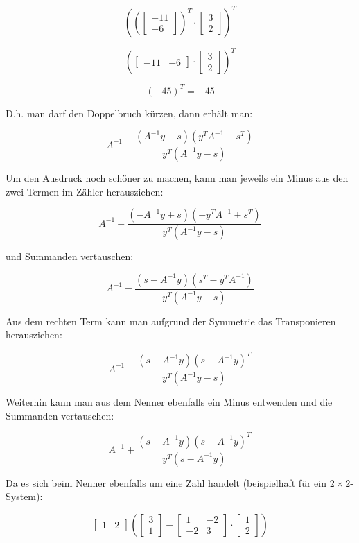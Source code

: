 \documentclass[a4paper, 12pt]{report}
\begin{document}
$$\left( \left(\begin{bmatrix}-11\\-6\end{bmatrix} \right)^T \cdot \begin{bmatrix}3\\2\end{bmatrix} \right)^T$$

$$\left( \begin{bmatrix}-11 & -6\end{bmatrix} \cdot \begin{bmatrix}3\\2\end{bmatrix} \right)^T$$

$$\left( -45 \right)^T = -45$$

D.h. man darf den Doppelbruch kürzen, dann erhält man:

$$ A^{-1} - \frac{ (A^{-1}y - s)(y^TA^{-1} - s^T) }{ y^T(A^{-1}y - s) } $$

Um den Ausdruck noch schöner zu machen, kann man jeweils ein Minus aus den zwei Termen im Zähler herausziehen:

$$ A^{-1} - \frac{ (-A^{-1}y + s)(-y^TA^{-1} + s^T) }{ y^T(A^{-1}y - s) } $$

und Summanden vertauschen:

$$ A^{-1} - \frac{ (s - A^{-1}y )(s^T - y^TA^{-1}) }{ y^T(A^{-1}y - s) } $$

Aus dem rechten Term kann man aufgrund der Symmetrie das Transponieren herausziehen:

$$ A^{-1} - \frac{ (s - A^{-1}y )(s - A^{-1}y)^T }{ y^T(A^{-1}y - s) } $$

Weiterhin kann man aus dem Nenner ebenfalls ein Minus entwenden und die Summanden vertauschen:

$$ A^{-1} + \frac{ (s - A^{-1}y )(s - A^{-1}y)^T }{ y^T(s - A^{-1}y) } $$

Da es sich beim Nenner ebenfalls um eine Zahl handelt (beispielhaft für ein $2\times 2$-System):

$$\begin{bmatrix}1 & 2\end{bmatrix}\left(\begin{bmatrix}3\\1\end{bmatrix} - \begin{bmatrix}1 & -2\\-2 & 3\end{bmatrix}\cdot\begin{bmatrix}1\\2\end{bmatrix}\right)$$
\end{document}
